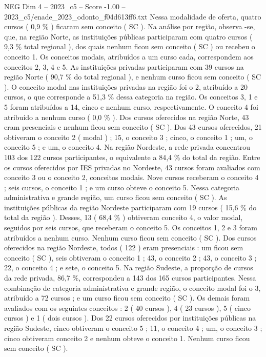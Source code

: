 \begin{textsample}{NEG Dim 4 – 2023\_c5 – Score -1.00 – 2023\_c5/enade\_2023\_odonto\_f04d613ff6.txt}
Nessa modalidade de oferta, quatro cursos ( 0,9 \% ) ficaram sem conceito ( SC ).
Na análise por região, observa -se, que, na região Norte, as instituições públicas participaram com quatro cursos ( 9,3 \% total regional ), dos quais nenhum ficou sem conceito ( SC ) ou recebeu o conceito 1.
Os conceitos modais, atribuídos a um curso cada, correspondem aos conceitos 2, 3, 4 e 5.
As instituições privadas participaram com 39 cursos na região Norte ( 90,7 \% do total regional ), e nenhum curso ficou sem conceito ( SC ).
O conceito modal nas instituições privadas na região foi o 2, atribuído a 20 cursos, o que corresponde a 51,3 \% dessa categoria na região.
Os conceitos 3, 1 e 5 foram atribuídos a 14, cinco e nenhum curso, respectivamente.
O conceito 4 foi atribuído a nenhum curso ( 0,0 \% ).
Dos cursos oferecidos na região Norte, 43 eram presenciais e nenhum ficou sem conceito ( SC ).
Dos 43 cursos oferecidos, 21 obtiveram o conceito 2 ( modal ) ; 15, o conceito 3 ; cinco, o conceito 1 ; um, o conceito 5 ; e um, o conceito 4.
Na região Nordeste, a rede privada concentrou 103 dos 122 cursos participantes, o equivalente a 84,4 \% do total da região.
Entre os cursos oferecidos por IES privadas no Nordeste, 43 cursos foram avaliados com conceito 3 ou o conceito 2, conceitos modais.
Nove cursos receberam o conceito 4 ; seis cursos, o conceito 1 ; e um curso obteve o conceito 5.
Nessa categoria administrativa e grande região, um curso ficou sem conceito ( SC ).
As instituições públicas da região Nordeste participaram com 19 cursos ( 15,6 \% do total da região ).
Desses, 13 ( 68,4 \% ) obtiveram conceito 4, o valor modal, seguidos por seis cursos, que receberam o conceito 5.
Os conceitos 1, 2 e 3 foram atribuídos a nenhum curso.
Nenhum curso ficou sem conceito ( SC ).
Dos cursos oferecidos na região Nordeste, todos ( 122 ) eram presenciais : um ficou sem conceito ( SC ), seis obtiveram o conceito 1 ; 43, o conceito 2 ; 43, o conceito 3 ; 22, o conceito 4 ; e sete, o conceito 5.
Na região Sudeste, a proporção de cursos da rede privada, 86,7 \%, correspondeu a 143 dos 165 cursos participantes.
Nessa combinação de categoria administrativa e grande região, o conceito modal foi o 3, atribuído a 72 cursos ; e um curso ficou sem conceito ( SC ).
Os demais foram avaliados com os seguintes conceitos : 2 ( 40 cursos ), 4 ( 23 cursos ), 5 ( cinco cursos ) e 1 ( dois cursos ).
Dos 22 cursos oferecidos por instituições públicas na região Sudeste, cinco obtiveram o conceito 5 ; 11, o conceito 4 ; um, o conceito 3 ; cinco obtiveram conceito 2 e nenhum obteve o conceito 1.
Nenhum curso ficou sem conceito ( SC ).

\end{textsample}
